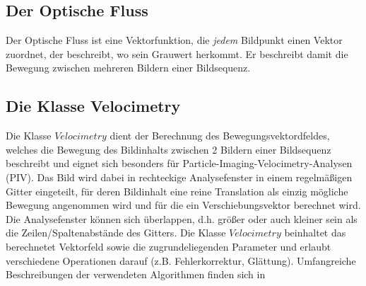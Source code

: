 
\subsection{Der Optische Fluss}
\label{optflow}

Der Optische Fluss ist eine Vektorfunktion, die \textit{jedem} Bildpunkt einen Vektor zuordnet, der beschreibt, wo sein Grauwert herkommt. Er beschreibt damit die Bewegung zwischen mehreren Bildern einer Bildsequenz.





\subsection{Die Klasse Velocimetry}
\label{Velocimetry}
Die Klasse $Velocimetry$ dient der Berechnung des Bewegungsvektordfeldes, welches
die Bewegung des Bildinhalts zwischen 2 Bildern einer Bildsequenz beschreibt und eignet sich besonders für Particle-Imaging-Velocimetry-Analysen (PIV).
Das Bild wird dabei in rechteckige Analysefenster in einem regelmäßigen Gitter eingeteilt, für deren Bildinhalt eine reine Translation als einzig mögliche Bewegung angenommen wird und für die ein Verschiebungsvektor berechnet wird.  Die Analysefenster können sich überlappen, d.h. größer oder auch kleiner sein als die Zeilen/Spaltenabstände des Gitters.
Die Klasse $Velocimetry$ beinhaltet das berechnetet Vektorfeld sowie die zugrundeliegenden Parameter und 
erlaubt verschiedene Operationen darauf (z.B. Fehlerkorrektur, Glättung). 
Umfangreiche Beschreibungen der verwendeten Algorithmen finden sich in\\

